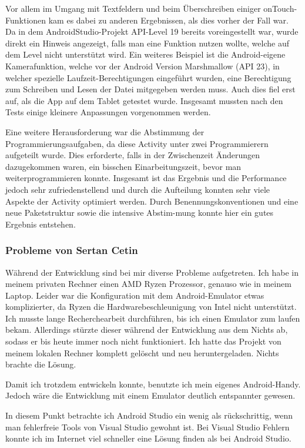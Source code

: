 Vor allem im Umgang mit Textfeldern und beim Überschreiben einiger onTouch-Funktionen kam es dabei zu anderen Ergebnissen, als dies vorher der Fall war. Da in dem AndroidStudio-Projekt API-Level 19 bereits voreingestellt war, wurde direkt ein Hinweis angezeigt, falls man eine Funktion nutzen wollte, welche auf dem Level nicht unterstützt wird. Ein weiteres Beispiel ist die Android-eigene Kamerafunktion, welche vor der Android Version Marshmallow (API 23), in welcher spezielle Laufzeit-Berechtigungen eingeführt wurden, eine Berechtigung zum Schreiben und Lesen der Datei mitgegeben werden muss. Auch dies fiel erst auf, als die App auf dem Tablet getestet wurde. Insgesamt mussten nach den Tests einige kleinere Anpassungen vorgenommen werden.

Eine weitere Herausforderung war die Abstimmung der Programmierungsaufgaben, da diese Activity unter zwei Programmierern aufgeteilt wurde. Dies erforderte, falls in der Zwischenzeit Änderungen dazugekommen waren, ein bisschen Einarbeitungszeit, bevor man weiterprogrammieren konnte. Insgesamt ist das Ergebnis und die Performance jedoch sehr zufriedenstellend und durch die Aufteilung konnten sehr viele Aspekte der Activity optimiert werden. Durch Benennungskonventionen und eine neue Paketstruktur sowie die intensive Abstim-mung konnte hier ein gutes Ergebnis entstehen.

\subsubsection{Probleme von Sertan Cetin}
Während der Entwicklung sind bei mir diverse Probleme aufgetreten. Ich habe in meinem privaten Rechner einen AMD Ryzen Prozessor, genauso wie in meinem Laptop. Leider war die Konfiguration mit dem Android-Emulator etwas komplizierter, da Ryzen die Hardwarebeschleunigung von Intel nicht unterstützt. Ich musste lange Recherchearbeit durchführen, bis ich einen Emulator zum laufen bekam. Allerdings stürzte dieser während der Entwicklung aus dem Nichts ab, sodass er bis heute immer noch nicht funktioniert. Ich hatte das Projekt von meinem lokalen Rechner komplett gelöscht und neu heruntergeladen. Nichts brachte die Lösung.

Damit ich trotzdem entwickeln konnte, benutzte ich mein eigenes Android-Handy. Jedoch wäre die Entwicklung mit einem Emulator deutlich entspannter gewesen.

In diesem Punkt betrachte ich Android Studio ein wenig als rückschrittig, wenn man fehlerfreie Tools von Visual Studio gewohnt ist. Bei Visual Studio Fehlern konnte ich im Internet viel schneller eine Lösung finden als bei Android Studio.

